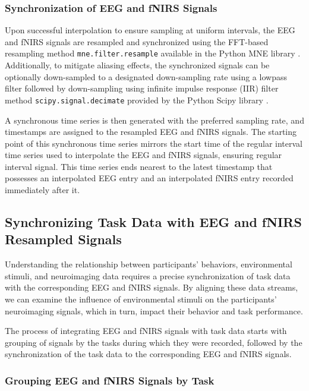 \subsubsection{Synchronization of EEG and fNIRS Signals}

Upon successful interpolation to ensure sampling at uniform intervals, the EEG and fNIRS signals are resampled and synchronized using the FFT-based resampling method \texttt{mne.filter.resample} available in the Python MNE library \cite{GramfortEtAl2013a}. Additionally, to mitigate aliasing effects, the synchronized signals can be optionally down-sampled to a designated down-sampling rate using a lowpass filter followed by down-sampling using infinite impulse response (IIR) filter method \texttt{scipy.signal.decimate} provided by the Python Scipy library \cite{2020SciPy-NMeth}.

A synchronous time series is then generated with the preferred sampling rate, and timestamps are assigned to the resampled EEG and fNIRS signals. The starting point of this synchronous time series mirrors the start time of the regular interval time series used to interpolate the EEG and fNIRS signals, ensuring regular interval signal. This time series ends nearest to the latest timestamp that possesses an interpolated EEG entry and an interpolated fNIRS entry recorded immediately after it.

\subsection{Synchronizing Task Data with EEG and fNIRS Resampled Signals}

Understanding the relationship between participants' behaviors, environmental stimuli, and neuroimaging data requires a precise synchronization of task data with the corresponding EEG and fNIRS signals. By aligning these data streams, we can examine the influence of environmental stimuli on the participants' neuroimaging signals, which in turn, impact their behavior and task performance.

The process of integrating EEG and fNIRS signals with task data starts with grouping of signals by the tasks during which they were recorded, followed by the synchronization of the task data to the corresponding EEG and fNIRS signals.

\subsubsection{Grouping EEG and fNIRS Signals by Task}

